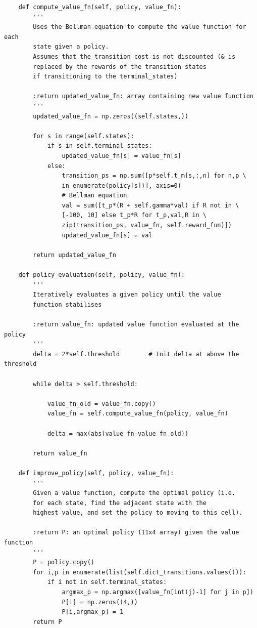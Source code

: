 \documentclass[12pt,twoside]{article}
\begin{document}
\begin{verbatim}
    def compute_value_fn(self, policy, value_fn):
        '''
        Uses the Bellman equation to compute the value function for each 
        state given a policy.
        Assumes that the transition cost is not discounted (& is
        replaced by the rewards of the transition states
        if transitioning to the terminal_states)

        :return updated_value_fn: array containing new value function
        '''
        updated_value_fn = np.zeros((self.states,))

        for s in range(self.states):
            if s in self.terminal_states:
                updated_value_fn[s] = value_fn[s]
            else:
                transition_ps = np.sum([p*self.t_m[s,:,n] for n,p \
                in enumerate(policy[s])], axis=0)
                # Bellman equation
                val = sum([t_p*(R + self.gamma*val) if R not in \
                [-100, 10] else t_p*R for t_p,val,R in \
                zip(transition_ps, value_fn, self.reward_fun)])      
                updated_value_fn[s] = val

        return updated_value_fn

    def policy_evaluation(self, policy, value_fn):
        '''
        Iteratively evaluates a given policy until the value
        function stabilises

        :return value_fn: updated value function evaluated at the policy
        '''
        delta = 2*self.threshold        # Init delta at above the threshold

        while delta > self.threshold:

            value_fn_old = value_fn.copy()
            value_fn = self.compute_value_fn(policy, value_fn)

            delta = max(abs(value_fn-value_fn_old))

        return value_fn

    def improve_policy(self, policy, value_fn):
        '''
        Given a value function, compute the optimal policy (i.e. 
        for each state, find the adjacent state with the 
        highest value, and set the policy to moving to this cell).

        :return P: an optimal policy (11x4 array) given the value function
        '''
        P = policy.copy()
        for i,p in enumerate(list(self.dict_transitions.values())):
            if i not in self.terminal_states:
                argmax_p = np.argmax([value_fn[int(j)-1] for j in p])
                P[i] = np.zeros((4,))
                P[i,argmax_p] = 1
        return P


\end{verbatim}
\end{document}
